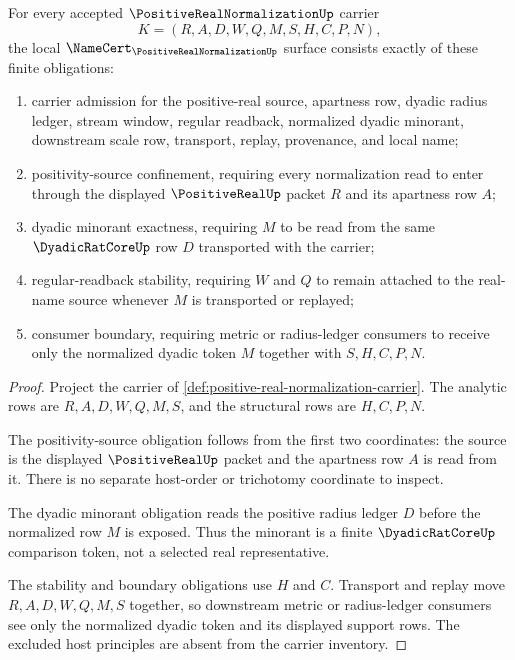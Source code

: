 \begin{theorem}
\label{thm:positive-real-normalization-namecert-obligations}
For every accepted $\PositiveRealNormalizationUp$ carrier
$$
K=(R,A,D,W,Q,M,S,H,C,P,N),
$$
the local $\NameCert_{\PositiveRealNormalizationUp}$ surface consists exactly of these finite obligations:
\begin{enumerate}
\item carrier admission for the positive-real source, apartness row, dyadic radius ledger, stream window, regular readback, normalized dyadic minorant, downstream scale row, transport, replay, provenance, and local name;
\item positivity-source confinement, requiring every normalization read to enter through the displayed $\PositiveRealUp$ packet $R$ and its apartness row $A$;
\item dyadic minorant exactness, requiring $M$ to be read from the same $\DyadicRatCoreUp$ row $D$ transported with the carrier;
\item regular-readback stability, requiring $W$ and $Q$ to remain attached to the real-name source whenever $M$ is transported or replayed;
\item consumer boundary, requiring metric or radius-ledger consumers to receive only the normalized dyadic token $M$ together with $S,H,C,P,N$.
\end{enumerate}
\end{theorem}
\begin{proof}
Project the carrier of \autoref{def:positive-real-normalization-carrier}. The analytic rows are $R,A,D,W,Q,M,S$, and the structural rows are $H,C,P,N$.

The positivity-source obligation follows from the first two coordinates: the source is the displayed $\PositiveRealUp$ packet and the apartness row $A$ is read from it. There is no separate host-order or trichotomy coordinate to inspect.

The dyadic minorant obligation reads the positive radius ledger $D$ before the normalized row $M$ is exposed. Thus the minorant is a finite $\DyadicRatCoreUp$ comparison token, not a selected real representative.

The stability and boundary obligations use $H$ and $C$. Transport and replay move $R,A,D,W,Q,M,S$ together, so downstream metric or radius-ledger consumers see only the normalized dyadic token and its displayed support rows. The excluded host principles are absent from the carrier inventory.
\end{proof}

